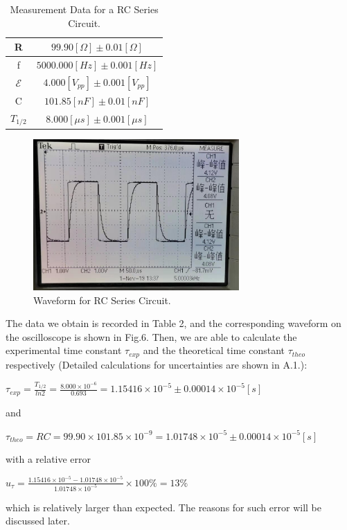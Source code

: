 \documentclass[a4paper,12pt]{article}
\begin{document}
\begin{table}[htbb]
\begin{center}
\begin{tabular}{|c|c|}
\hline
R & $99.90 [\Omega] \pm 0.01 [\Omega]$ \\ \hline
f & $ 5000.000 [Hz] \pm 0.001 [Hz] $ \\ \hline
$\mathcal{E}$ & $ 4.000[V_{pp}] \pm 0.001[V_{pp}] $ \\ \hline
C & $ 101.85 [nF] \pm 0.01 [nF] $ \\ \hline
$T_{1/2}$ & $ 8.000[\mu s] \pm 0.001[\mu s] $ \\ \hline
\end{tabular}
\caption{Measurement Data for a RC Series Circuit.}
\end{center}
\end{table}

\begin{figure}[htb] 
    \centering
    \includegraphics[width=0.7\textwidth]{p1} 
    \caption{Waveform for RC Series Circuit.} 
\end{figure}

\newpage
The data we obtain is recorded in Table 2, and the corresponding waveform on the oscilloscope is shown in Fig.6. Then, we are able to calculate the experimental time constant $\tau_{exp}$ and the theoretical time constant $\tau_{theo}$ respectively (Detailed calculations for uncertainties are shown in A.1.):
\begin{center}
$\displaystyle \tau_{exp} = \frac{T_{1/2}}{ln2} = \frac{8.000\times 10^{-6}}{0.693} = 1.15416 \times 10^{-5} \pm 0.00014 \times 10^{-5} [s]$
\end{center}
and
\begin{center}
$\tau_{theo} = RC = 99.90 \times 101.85 \times 10^{-9} = 1.01748 \times 10^{-5} \pm 0.00014 \times 10^{-5} [s] $
\end{center}
with a relative error 
\begin{center}
$\displaystyle u_\tau = \frac{1.15416 \times 10^{-5} - 1.01748 \times 10^{-5}}{1.01748 \times 10^{-5}} \times 100\% = 13\% $ 
\end{center}
which is relatively larger than expected. The reasons for such error will be discussed later.
\end{document}
